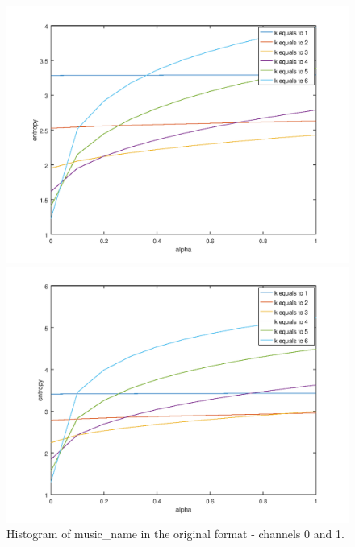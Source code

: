 \documentclass[12pt]{article}
\begin{document}
\begin{figure}[H]
  \centering
  \begin{minipage}{.5\textwidth}
    \centering
    \includegraphics[width=\linewidth]{bible_en.png}
  \end{minipage}%
  \begin{minipage}{.5\textwidth}
    \centering
    \includegraphics[width=\linewidth]{bible_pt.png}
  \end{minipage}
  \caption{Histogram of music\_name in the original format - channels 0 and 1.}
  \label{fig:histogram_stereo}
  

\end{figure}
\end{document}
